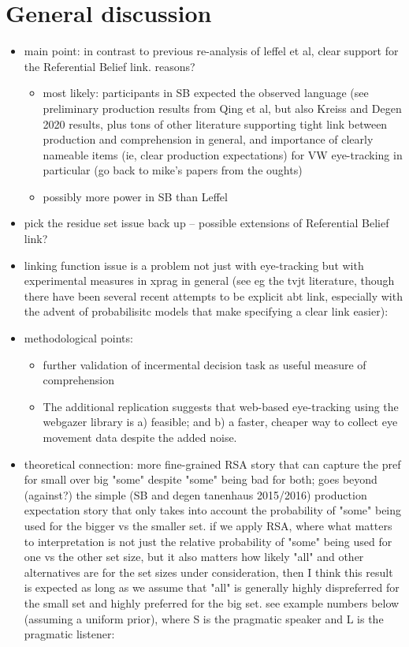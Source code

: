 \documentclass[10pt,letterpaper]{article}
\begin{document}
\section{General discussion}

\begin{itemize}
	\item main point: in contrast to previous re-analysis of leffel et al, clear support for the Referential Belief link. reasons? 
	\begin{itemize}
		\item most likely: participants in SB expected the observed language (see preliminary production results from Qing et al, but also Kreiss and Degen 2020 results, plus tons of other literature supporting tight link between production and comprehension in general, and importance of clearly nameable items (ie, clear production expectations) for VW eye-tracking in particular (go back to mike's papers from the oughts)
		\item possibly more power in SB than Leffel
	\end{itemize}
	\item pick the residue set issue back up -- possible extensions of Referential Belief link?
	\item linking function issue is a problem not just with eye-tracking but with experimental measures in xprag in general (see eg the tvjt literature, though there have been several recent attempts to be explicit abt link, especially with the advent of probabilisitc models that make specifying a clear link easier): \cite{Jasbi2019, WaldonDegen2020, franke2014typical, savinelli2018, franke2016link, scholler2017semantic, tessler2019language}
	\item methodological points:
		\begin{itemize}
			\item further validation of incermental decision task as useful measure of comprehension
			\item The additional replication suggests that web-based eye-tracking using the webgazer library is a) feasible; and b) a faster, cheaper way to collect eye movement data despite the added noise.
		\end{itemize}
	\item theoretical connection: more fine-grained RSA story that can capture the pref for small over big "some" despite "some" being bad for both; goes beyond (against?) the simple (SB and degen tanenhaus 2015/2016) production expectation story that only takes into account the probability of "some" being used for the bigger vs the smaller set. if we apply RSA, where what matters to interpretation is not just the relative probability of "some" being used for one vs the other set size, but it also matters how likely "all" and other alternatives are for the set sizes under consideration, then I think this result is expected as long as we assume that "all" is generally highly dispreferred for the small set and highly preferred for the big set. see example numbers below (assuming a uniform prior), where S is the pragmatic speaker and L is the pragmatic listener:
\end{itemize}
\end{document}
